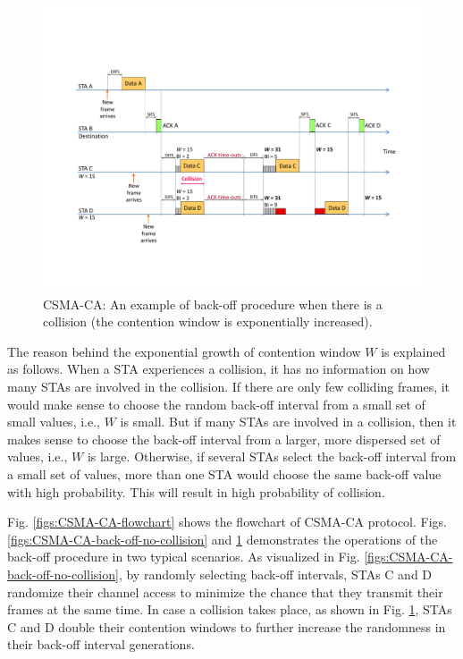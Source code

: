 \documentclass[journal,draftclsnofoot,12pt,onecolumn]{IEEEtran}
\begin{document}
\begin{figure}[!t]
\centering
\includegraphics[width=1.0\columnwidth]{figures2/CSMA-CA-back-off-with-collision}
\caption{CSMA-CA: An example of back-off procedure when there is a collision (the contention window is exponentially increased).}
\label{figs:CSMA-CA-back-off-with-collision}
\end{figure}

The reason behind the exponential growth of contention window $W$ is explained as follows. When a STA experiences a collision, it has no information on how many STAs are involved in the collision. If there are only few colliding frames, it would make sense to choose the random back-off interval from a small set of small values, i.e., $W$ is small. But if many STAs are involved in a collision, then it makes sense to choose the back-off interval from a larger, more dispersed set of values, i.e., $W$ is large. Otherwise, if several STAs select the back-off interval from a small set of values, more than one STA would choose the same back-off value with high probability. This will result in high probability of collision.

Fig. \ref{figs:CSMA-CA-flowchart} shows the flowchart of CSMA-CA protocol. Figs. \ref{figs:CSMA-CA-back-off-no-collision} and \ref{figs:CSMA-CA-back-off-with-collision} demonstrates the operations of the back-off procedure in two typical scenarios. As visualized in Fig. \ref{figs:CSMA-CA-back-off-no-collision}, by randomly selecting back-off intervals, STAs C and D randomize their channel access to minimize the chance that they transmit their frames at the same time. In case a collision takes place, as shown in Fig. \ref{figs:CSMA-CA-back-off-with-collision}, STAs C and D double their contention windows to further increase the randomness in their back-off interval generations.
\end{document}
